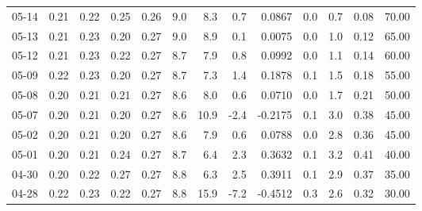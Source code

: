 \begin{threeparttable}
{\begin{tabular}{lrrrrrrrrrrrr}
  05-14 &          0.21 &          0.22 &          0.25 &        0.26 &                 9.0 &                 8.3 &        0.7 &       0.0867 &                 0.0 &              0.7 &            0.08 &                  70.00 \\
  05-13 &          0.21 &          0.23 &          0.20 &        0.27 &                 9.0 &                 8.9 &        0.1 &       0.0075 &                 0.0 &              1.0 &            0.12 &                  65.00 \\
  05-12 &          0.21 &          0.23 &          0.22 &        0.27 &                 8.7 &                 7.9 &        0.8 &       0.0992 &                 0.0 &              1.1 &            0.14 &                  60.00 \\
  05-09 &          0.22 &          0.23 &          0.20 &        0.27 &                 8.7 &                 7.3 &        1.4 &       0.1878 &                 0.1 &              1.5 &            0.18 &                  55.00 \\
  05-08 &          0.20 &          0.21 &          0.21 &        0.27 &                 8.6 &                 8.0 &        0.6 &       0.0710 &                 0.0 &              1.7 &            0.21 &                  50.00 \\
  05-07 &          0.20 &          0.21 &          0.20 &        0.27 &                 8.6 &                10.9 &       -2.4 &      -0.2175 &                 0.1 &              3.0 &            0.38 &                  45.00 \\
  05-02 &          0.20 &          0.21 &          0.20 &        0.27 &                 8.6 &                 7.9 &        0.6 &       0.0788 &                 0.0 &              2.8 &            0.36 &                  45.00 \\
  05-01 &          0.20 &          0.21 &          0.24 &        0.27 &                 8.7 &                 6.4 &        2.3 &       0.3632 &                 0.1 &              3.2 &            0.41 &                  40.00 \\
  04-30 &          0.20 &          0.22 &          0.27 &        0.27 &                 8.8 &                 6.3 &        2.5 &       0.3911 &                 0.1 &              2.9 &            0.37 &                  35.00 \\
  04-28 &          0.22 &          0.23 &          0.22 &        0.27 &                 8.8 &                15.9 &       -7.2 &      -0.4512 &                 0.3 &              2.6 &            0.32 &                  30.00 \\

\end{tabular}}
\end{threeparttable}

